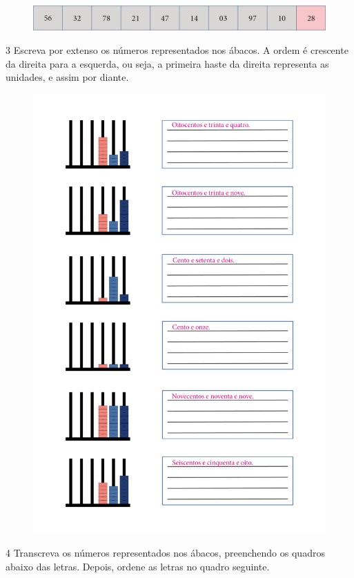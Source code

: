 \begin{figure}[htpb!]
\includegraphics[width=\textwidth]{./media/image4.png}
\end{figure}

\pagebreak
\num{3} Escreva por extenso os números representados nos ábacos. A ordem
é crescente da direita para a esquerda, ou seja, a primeira haste da
direita representa as unidades, e assim por diante.

\begin{figure}[htpb!]
\includegraphics[width=.7\textwidth]{./media/image5_prof.png}
\end{figure}

\pagebreak
\num{4} Transcreva os números representados nos ábacos, preenchendo os
quadros abaixo das letras. Depois, ordene as letras no quadro seguinte.

